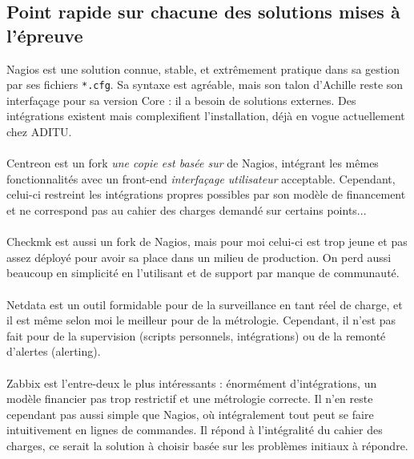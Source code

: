 \subsection{Point rapide sur chacune des solutions mises à l'épreuve}

Nagios est une solution connue, stable, et extrêmement pratique dans sa gestion par ses fichiers \texttt{*.cfg}. Sa syntaxe est agréable, mais son talon d'Achille reste son interfaçage pour sa version Core : il a besoin de solutions externes. Des intégrations existent mais complexifient l'installation, déjà en vogue actuellement chez ADITU.
\\ \\
Centreon est un fork \textit{une copie est basée sur} de Nagios, intégrant les mêmes fonctionnalités avec un front-end \textit{interfaçage utilisateur} acceptable. Cependant, celui-ci restreint les intégrations propres possibles par son modèle de financement et ne correspond pas au cahier des charges demandé sur certains points...
\\ \\
Checkmk est aussi un fork de Nagios, mais pour moi celui-ci est trop jeune et pas assez déployé pour avoir sa place dans un milieu de production. On perd aussi beaucoup en simplicité en l'utilisant et de support par manque de communauté.
\\ \\
Netdata est un outil formidable pour de la surveillance en tant réel de charge, et il est même selon moi le meilleur pour de la métrologie. Cependant, il n'est pas fait pour de la supervision (scripts personnels, intégrations) ou de la remonté d'alertes (alerting).
\\ \\
Zabbix est l'entre-deux le plus intéressants : énormément d'intégrations, un modèle financier pas trop restrictif et une métrologie correcte. Il n'en reste cependant pas aussi simple que Nagios, où intégralement tout peut se faire intuitivement en lignes de commandes. Il répond à l'intégralité du cahier des charges, ce serait la solution à choisir basée sur les problèmes initiaux à répondre.